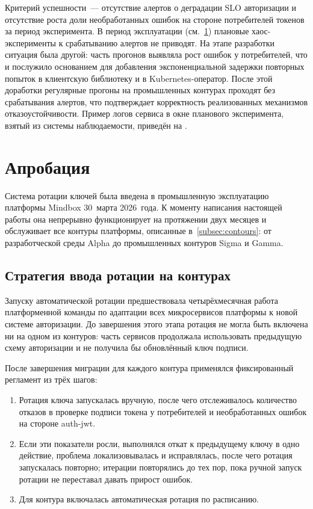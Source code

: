 Критерий успешности~--- отсутствие алертов о деградации SLO
авторизации и отсутствие роста доли необработанных ошибок
на стороне потребителей токенов за период эксперимента.
В период эксплуатации (см.~\ref{sec:ch4-rollout})
плановые хаос-эксперименты к срабатыванию алертов не приводят.
На этапе разработки ситуация была другой:
часть прогонов выявляла рост ошибок у потребителей,
что и послужило основанием для добавления
экспоненциальной задержки повторных попыток
в клиентскую библиотеку и в Kubernetes-оператор.
После этой доработки регулярные прогоны на промышленных контурах
проходят без срабатывания алертов,
что подтверждает корректность реализованных механизмов
отказоустойчивости.
Пример логов сервиса в окне планового эксперимента,
взятый из системы наблюдаемости, приведён на .

\section{Апробация}\label{sec:ch4-rollout}

Система ротации ключей была введена в промышленную эксплуатацию
платформы Mindbox 30~марта 2026~года.
К моменту написания настоящей работы
она непрерывно функционирует на протяжении двух месяцев
и обслуживает все контуры платформы, описанные в~\ref{subsec:contours}:
от разработческой среды Alpha до промышленных контуров Sigma и Gamma.

\subsection{Стратегия ввода ротации на контурах}\label{subsec:ch4-rollout-strategy}

Запуску автоматической ротации предшествовала четырёхмесячная
работа платформенной команды по адаптации всех микросервисов
платформы к новой системе авторизации.
До завершения этого этапа ротация не могла быть включена ни на одном
из контуров: часть сервисов продолжала использовать предыдущую
схему авторизации и не получила бы обновлённый ключ подписи.

После завершения миграции для каждого контура применялся
фиксированный регламент из трёх шагов:

\begin{enumerate}
  \item Ротация ключа запускалась вручную,
        после чего отслеживалось количество отказов в проверке
        подписи токена у потребителей и необработанных ошибок
        на стороне auth-jwt.
  \item Если эти показатели росли, выполнялся откат к предыдущему
        ключу в одно действие, проблема локализовывалась
        и исправлялась, после чего ротация запускалась повторно;
        итерации повторялись до тех пор, пока ручной запуск ротации
        не переставал давать прирост ошибок.
  \item Для контура включалась автоматическая ротация
        по расписанию.
\end{enumerate}


